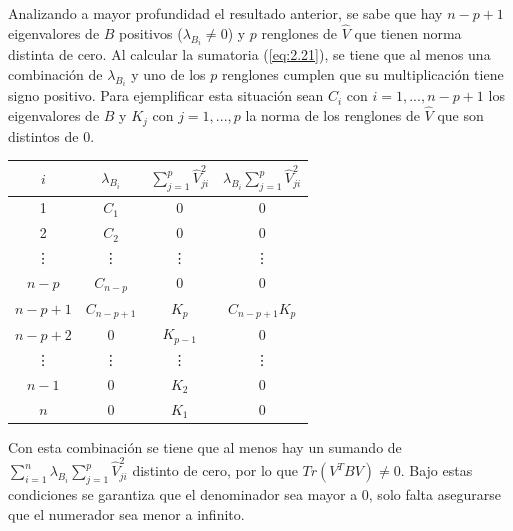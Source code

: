 Analizando a mayor profundidad el resultado anterior, se sabe que hay $n-p+1$ eigenvalores de $B$ positivos ($\lambda_{B_i} \neq 0$) y $p$ renglones de $\widehat{V}$ que tienen norma distinta de cero. Al calcular la sumatoria (\ref{eq:2.21}), se tiene que al menos una combinación de $\lambda_{B_i}$ y uno de los $p$ renglones cumplen que su multiplicación tiene signo positivo. Para ejemplificar esta situación sean $C_i$ con $i = 1, ... , n-p+1$ los eigenvalores de $B$ y $K_j$ con $j = 1, ... , p$ la norma de los renglones de $\widehat{V}$ que son distintos de $0$.
 
\begin{center}
\begin{tabular}{ | c | c|  c | c|} 
\hline
$i$ & $\lambda_{B_i}$ & $\sum \limits_{j=1}^{p} \widehat{V}_{ji}^2$  & $\lambda_{B_i} \sum \limits_{j=1}^{p} \widehat{V}_{ji}^2$ \\ 
\hline
\hline
1 & $C_1$ & $0$ & $0$ \\ 
\hline
2 & $C_2$ & $0$ & $0$ \\ 
\hline
\vdots & \vdots & \vdots & \vdots \\ 
\hline
$n-p$ & $C_{n-p}$ & $0$ &  $0$\\ 
\hline
$n-p+1$ & $C_{n-p+1}$ & $K_{p}$ &  $C_{n-p+1} K_{p}$\\ 
\hline
$n-p+2$ & $0$ & $K_{p-1}$  & $0$ \\ 
\hline
\vdots & \vdots & \vdots & \vdots  \\ 
\hline
$n-1$ & $0$ & $K_2$ & $0$ \\ 
\hline
$n$ & $0$ & $K_1$ & $0$ \\ 
\hline
\hline

\end{tabular}
\end{center}

Con esta combinación se tiene que al menos hay un sumando de $\sum\limits_{i=1}^{n} \lambda_{B_i} \sum \limits_{j=1}^{p} \widehat{V}_{ji}^2 $ distinto de cero, por lo que $Tr(V^T B V) \neq 0$. Bajo estas condiciones se garantiza que el denominador sea mayor a 0, solo falta asegurarse que el numerador sea menor a infinito.

